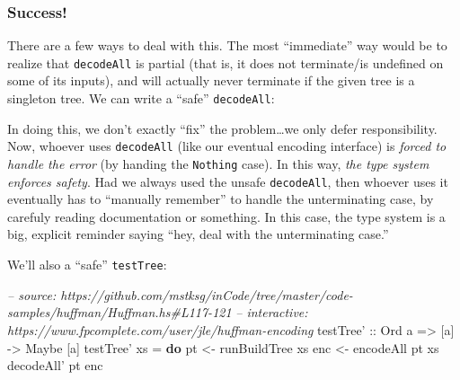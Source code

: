\documentclass[]{article}
\newenvironment{Shaded}{\begin{snugshade}}{\end{snugshade}}
\newcommand{\CommentTok}[1]{\textcolor[rgb]{0.56,0.35,0.01}{\textit{#1}}}
\newcommand{\DataTypeTok}[1]{\textcolor[rgb]{0.13,0.29,0.53}{#1}}
\newcommand{\FunctionTok}[1]{\textcolor[rgb]{0.00,0.00,0.00}{#1}}
\newcommand{\KeywordTok}[1]{\textcolor[rgb]{0.13,0.29,0.53}{\textbf{#1}}}
\newcommand{\NormalTok}[1]{#1}
\newcommand{\OtherTok}[1]{\textcolor[rgb]{0.56,0.35,0.01}{#1}}
\begin{document}
\hypertarget{success}{%
\subsubsection{Success!}\label{success}}

There are a few ways to deal with this. The most ``immediate'' way would be to
realize that \texttt{decodeAll} is partial (that is, it does not terminate/is
undefined on some of its inputs), and will actually never terminate if the given
tree is a singleton tree. We can write a ``safe'' \texttt{decodeAll}:

\begin{Shaded}
\end{Shaded}

In doing this, we don't exactly ``fix'' the problem\ldots{}we only defer
responsibility. Now, whoever uses \texttt{decodeAll\textquotesingle{}} (like our
eventual encoding interface) is \emph{forced to handle the error} (by handing
the \texttt{Nothing} case). In this way, \emph{the type system enforces safety}.
Had we always used the unsafe \texttt{decodeAll}, then whoever uses it
eventually has to ``manually remember'' to handle the unterminating case, by
carefuly reading documentation or something. In this case, the type system is a
big, explicit reminder saying ``hey, deal with the unterminating case.''

We'll also a ``safe'' \texttt{testTree}:

\begin{Shaded}
\begin{Highlighting}[]
\CommentTok{-- source: https://github.com/mstksg/inCode/tree/master/code-samples/huffman/Huffman.hs#L117-121}
\CommentTok{-- interactive: https://www.fpcomplete.com/user/jle/huffman-encoding}
\OtherTok{testTree' ::} \DataTypeTok{Ord}\NormalTok{ a }\OtherTok{=>}\NormalTok{ [a] }\OtherTok{->} \DataTypeTok{Maybe}\NormalTok{ [a]}
\NormalTok{testTree' xs }\FunctionTok{=} \KeywordTok{do}
\NormalTok{    pt  }\OtherTok{<-}\NormalTok{ runBuildTree xs}
\NormalTok{    enc }\OtherTok{<-}\NormalTok{ encodeAll pt xs}
\NormalTok{    decodeAll' pt enc}
\end{Highlighting}
\end{Shaded}
\end{document}
